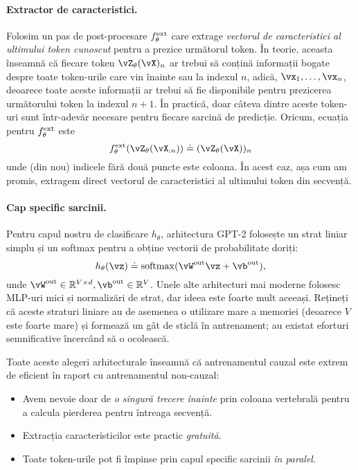 \documentclass[../../book-main_ro.tex]{subfiles}
\begin{document}
\paragraph{Extractor de caracteristici.} Folosim un pas de post-procesare \(f_{\theta}^{\mathrm{ext}}\) care extrage \textit{vectorul de caracteristici al ultimului token cunoscut} pentru a prezice următorul token. În teorie, aceasta înseamnă că fiecare token \(\vZ_{\theta}(\vX)_{n}\) ar trebui să conțină informații bogate despre toate token-urile care vin înainte sau la indexul \(n\), adică, \(\vx_{1}, \dots, \vx_{n}\), deoarece toate aceste informații ar trebui să fie disponibile pentru prezicerea următorului token la indexul \(n + 1\). În practică, doar câteva dintre aceste token-uri sunt într-adevăr necesare pentru fiecare sarcină de predicție. Oricum, ecuația pentru \(f_{\theta}^{\mathrm{ext}}\) este
\begin{equation}
    f_{\theta}^{\ext}(\vZ_{\theta}(\vX_{:n})) \doteq (\vZ_{\theta}(\vX))_{n}
\end{equation}
unde (din nou) indicele fără două puncte este coloana. În acest caz, așa cum am promis, extragem direct vectorul de caracteristici al ultimului token din secvență.

\paragraph{Cap specific sarcinii.} Pentru capul nostru de clasificare \(h_{\theta}\), arhitectura GPT-2 folosește un strat liniar simplu și un softmax pentru a obține vectorii de probabilitate doriți:
\begin{equation}
    h_{\theta}(\vz) \doteq \softmax(\vW^{\out}\vz + \vb^{\out}),
\end{equation}
unde \(\vW^{\out} \in \R^{V \times d}, \vb^{\out} \in \R^{V}\). Unele alte arhitecturi mai moderne folosesc MLP-uri mici și normalizări de strat, dar ideea este foarte mult aceeași. Rețineți că aceste straturi liniare au de asemenea o utilizare mare a memoriei (deoarece \(V\) este foarte mare) și formează un gât de sticlă în antrenament; au existat eforturi semnificative încercând să o ocolească.

Toate aceste alegeri arhitecturale înseamnă că antrenamentul cauzal este extrem de eficient în raport cu antrenamentul non-cauzal:
\begin{itemize}
    \item Avem nevoie doar de \textit{o singură trecere înainte} prin coloana vertebrală pentru a calcula pierderea pentru întreaga secvență.
    \item Extracția caracteristicilor este practic \textit{gratuită}.
    \item Toate token-urile pot fi împinse prin capul specific sarcinii \textit{în paralel}.
\end{itemize}
\end{document}
